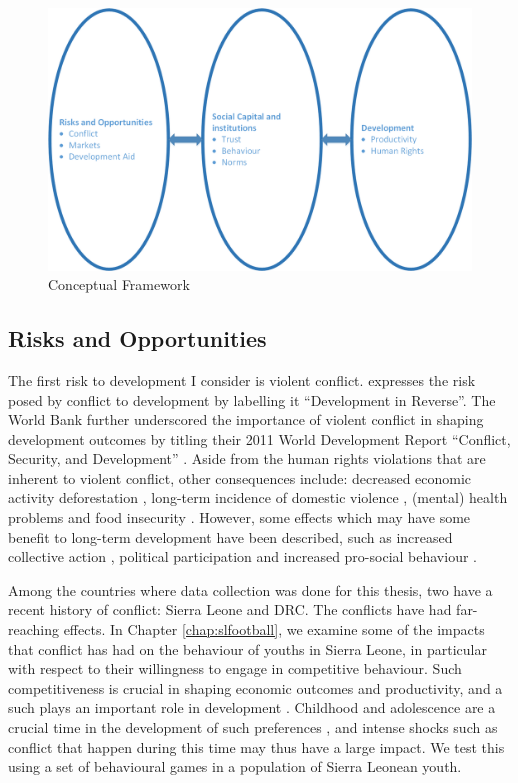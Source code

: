 \begin{figure}[htb]
  \centering
  \includegraphics[width=0.8\linewidth]{"chapters/introduction/figures/conceptual_framework.png"}
  \caption{Conceptual Framework}
  \label{intro:fig:framework}
\end{figure}

\subsection{Risks and Opportunities}
The first risk to development I consider is violent conflict. \citet{Collier2003}  expresses the risk posed by conflict to development by labelling it ``Development in Reverse''. The World Bank further underscored the importance of violent conflict in shaping development outcomes by titling their 2011 World Development Report ``Conflict, Security, and Development'' \citep{WorldBank2011}. Aside from the human rights violations that are inherent to violent conflict, other consequences include: decreased economic activity \citep{Collier1999} deforestation \cite[e.g.][]{Connectiona}, long-term incidence of domestic violence \citep[e.g.][]{LaMattina2017, Muller2019}, (mental) health problems \cite[e.g.][]{Smith2002, Iqbal2006a,Akresh2011} and food insecurity \cite[e.g.][]{Lecoutere2005, Verwimp2012}. However, some effects which may have some benefit to long-term development have been described, such as increased collective action \citep{Bellows2009b}, political participation \citep{Blattman2009a} and increased pro-social behaviour \citep{Voors2012a}.

Among the countries where data collection was done for this thesis, two have a recent history of conflict: Sierra Leone and DRC. The conflicts have had far-reaching effects. In Chapter \ref{chap:slfootball}, we examine some of the impacts that conflict has had on the behaviour of youths in Sierra Leone, in particular with respect to their willingness to engage in competitive behaviour. Such competitiveness is crucial in shaping economic outcomes and productivity, and a such plays an important role in development \citep{Niederle2007}. Childhood and adolescence are a crucial time in the development of such preferences \citep{Benenson2007,Fehr2008,Sutter2007a}, and intense shocks such as conflict that happen during this time may thus have a large impact. We test this using a set of behavioural games in a population of Sierra Leonean youth.

